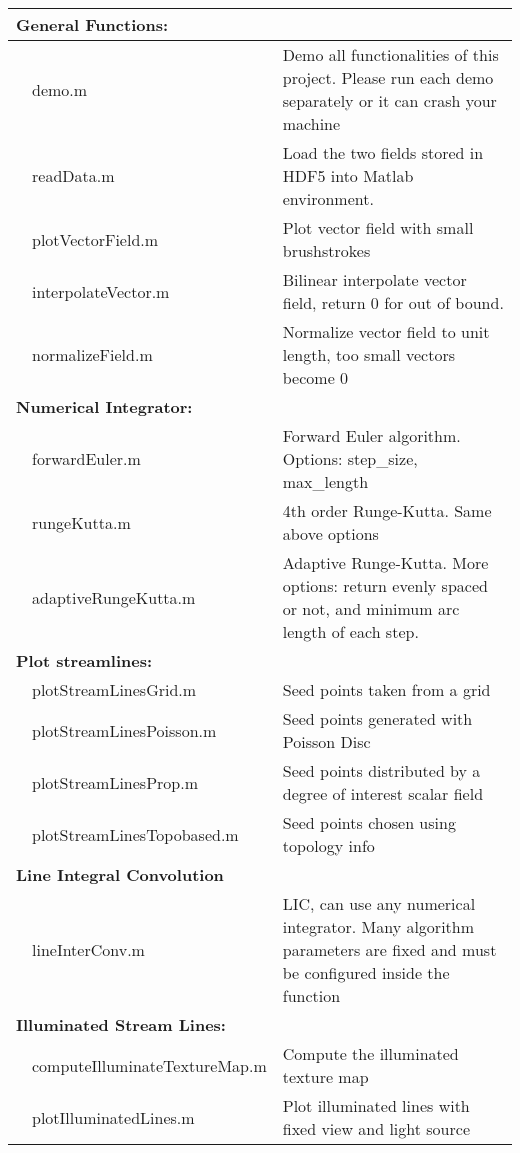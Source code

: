 \documentclass[10pt,a4paper]{article}
\begin{document}
	\begin{tabular}{p{0.05cm} p{5cm}|p{10cm}}
		\hline \multicolumn{2}{l|}{\bf{General Functions:}} &\\ 
		\hline
			 	& demo.m & Demo all functionalities of this project. Please run each demo separately or it can crash your machine\\ 
			 	& readData.m &  Load the two fields stored in HDF5 into Matlab environment. \\
			 	& plotVectorField.m & Plot vector field with small brushstrokes\\
			 	& interpolateVector.m & Bilinear interpolate vector field, return 0 for out of bound.\\
			 	& normalizeField.m & Normalize vector field to unit length, too small vectors become 0\\
		\hline \multicolumn{2}{l|}{\bf{Numerical Integrator:}} &\\ 
		\hline
			   & forwardEuler.m &  Forward Euler algorithm. Options: step\_size, max\_length \\ 
			   & rungeKutta.m &  4th order Runge-Kutta. Same above options\\ 
			   & adaptiveRungeKutta.m & Adaptive Runge-Kutta. More options: return evenly spaced or not, and minimum arc length of each step.\\ 
		\hline \multicolumn{2}{l|}{\bf{Plot streamlines:}} & \\ 
		\hline
			   & plotStreamLinesGrid.m & Seed points taken from a grid\\
			   & plotStreamLinesPoisson.m & Seed points generated with Poisson Disc \\
			   & plotStreamLinesProp.m & Seed points distributed by a degree of interest scalar field\\
			   & plotStreamLinesTopobased.m & Seed points chosen using topology info\\
		\hline \multicolumn{2}{l|}{\bf{Line Integral Convolution}} & \\ 
		\hline
			   & lineInterConv.m & LIC, can use any numerical integrator. Many algorithm parameters are fixed and must be configured inside the function\\
		\hline \multicolumn{2}{l|}{\bf{Illuminated Stream Lines:}} & \\ 
		\hline
			   & computeIlluminateTextureMap.m & Compute the illuminated texture map\\
			   & plotIlluminatedLines.m & Plot illuminated lines with fixed view and light source \\

\end{tabular}
\end{document}
